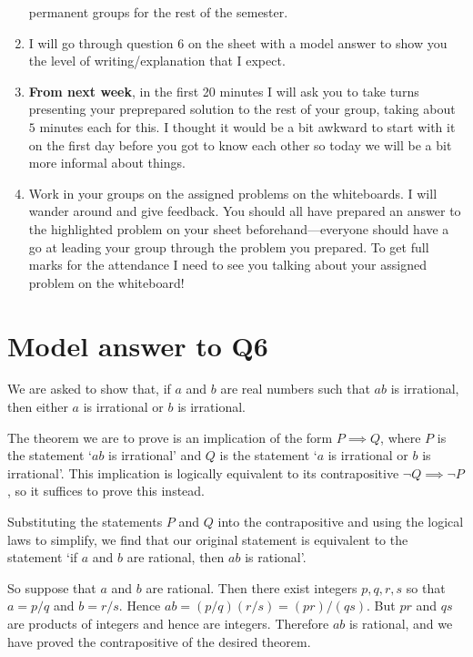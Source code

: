 \documentclass[a4paper,11pt]{article}
\begin{document}
\begin{enumerate}
          permanent groups for the rest of the semester.
    \item I will go through question 6 on the sheet with a model answer to show you the level of writing/explanation that I expect.
    \item \textbf{From next week}, in the first 20 minutes I will ask you to take turns presenting your preprepared solution to the rest of your group, taking about $5$ minutes each for this.
          I thought it would be a bit awkward to start with it on the first day before you got to know each other so today we will be a bit more informal about things.
    \item Work in your groups on the assigned problems on the whiteboards. I will wander around and give feedback. You should all have prepared an answer to the highlighted problem on your
          sheet beforehand---everyone should have a go at leading your group through the problem you prepared. To get full marks for the attendance I need to see you talking about your
          assigned problem on the whiteboard!
  \end{enumerate}

  \clearpage

  \section{Model answer to Q6}
  We are asked to show that, if $ a $ and $ b $ are real numbers such that $ ab $ is irrational, then either $ a $ is irrational or $ b $ is irrational.

  The theorem we are to prove is an implication of the form $ P \implies Q $, where $ P $ is the statement `$ ab $ is irrational' and $ Q $ is the statement `$a$ is irrational or $b$ is irrational'.
  This implication is logically equivalent to its contrapositive $ \neg Q \implies \neg P $, so it suffices to prove this instead.

  Substituting the statements $ P $ and $ Q $ into the contrapositive and using the logical laws to simplify, we find that our original statement is equivalent to the
  statement `if $a$ and $ b$ are rational, then $ ab $ is rational'.

  So suppose that $ a $ and $ b $ are rational. Then there exist integers $ p,q,r,s $ so that $ a = p/q $ and $ b = r/s $. Hence $ ab = (p/q)(r/s) = (pr)/(qs) $. But $ pr $ and $ qs $
  are products of integers and hence are integers. Therefore $ ab $ is rational, and we have proved the contrapositive of the desired theorem.
\end{document}

